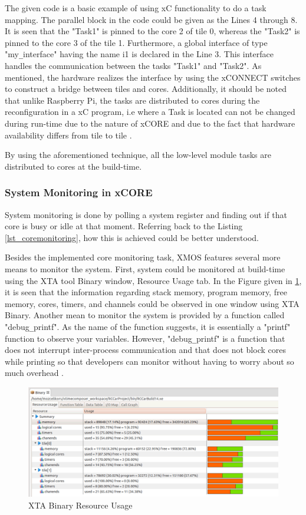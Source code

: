 The given code is a basic example of using xC functionality to do a task mapping. The parallel block in the code could be given as the Lines 4 through 8. It is seen that the "Task1" is pinned to the core 2 of tile 0, whereas the "Task2" is pinned to the core 3 of the tile 1. Furthermore, a global interface of type "my\texttt{\_}interface" having the name i1 is declared in the Line 3. This interface handles the communication between the tasks "Task1" and "Task2". As mentioned, the hardware realizes the interface by using the xCONNECT switches to construct a bridge between tiles and cores. Additionally, it should be noted that unlike Raspberry Pi, the tasks are distributed to cores during the reconfiguration in a xC program, i.e where a Task is located can not be changed during run-time due to the nature of xCORE and due to the fact that hardware availability differs from tile to tile \cite{xmosprogrguide}.

By using the aforementioned technique, all the low-level module tasks are distributed to cores at the build-time. 

\subsubsection{System Monitoring in xCORE}
System monitoring is done by polling a system register and finding out if that core is busy or idle at that moment. Referring back to the Listing  \ref{lst_coremonitoring}, how this is achieved could be better understood.

Besides the implemented core monitoring task, XMOS features several more means to monitor the system. First, system could be monitored at build-time using the XTA tool Binary window, Resource Usage tab. In the Figure given in \ref{fig:binaryresourceusage}, it is seen that the information regarding stack memory, program memory, free memory, cores, timers, and channels could be observed in one window using XTA Binary. Another mean to monitor the system is provided by a function called "debug\texttt{\_}printf". As the name of the function suggests, it is essentially a "printf" function to observe your variables. However, "debug\texttt{\_}printf" is a function that does not interrupt inter-process communication and that does not block cores while printing so that developers can monitor without having to worry about so much overhead \cite{xmosprogrguide}.

\begin{figure}[!ht]
	\centering
	\includegraphics[width=\textwidth]{content/images/binaryresourceusage.png}
	\caption{XTA Binary Resource Usage}
	\label{fig:binaryresourceusage}
\end{figure}

